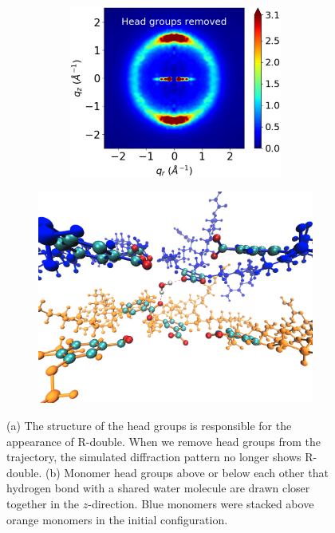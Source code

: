 \documentclass[journal=jpcbfk,manuscript=article]{achemso}
\begin{document}
  \begin{figure}[!htb]
  \begin{subfigure}{0.45\textwidth}
  \centering
  \begin{subfigure}{\textwidth}
  \includegraphics[width=\textwidth]{nophenyls_rzplot.pdf}
  \end{subfigure}
  \caption{}\label{fig:rdouble_nophenyls}
  \end{subfigure}
  \begin{subfigure}{0.45\textwidth}
  \centering
  \includegraphics[width=\textwidth]{hbonds_tails.pdf}
  \caption{}\label{fig:hbond_visualization}
  \end{subfigure}
  \caption{(a) The structure of the head groups is responsible for the appearance of
  R-double. When we remove head groups from the trajectory, the simulated 
  diffraction pattern no longer shows R-double. (b) Monomer head groups above or below
  each other that hydrogen bond with a shared water molecule are drawn closer
  together in the $z$-direction. Blue monomers were stacked above orange monomers in the
  initial configuration.}\label{fig:hbonds}
  \end{figure}
  
\end{document}
